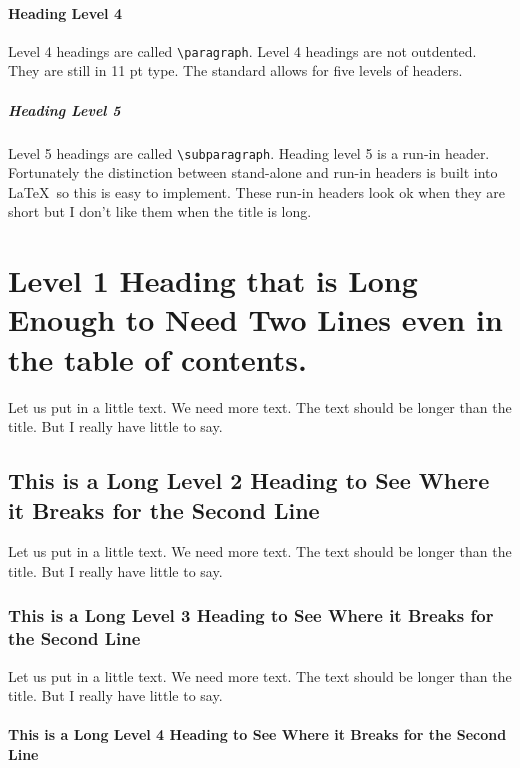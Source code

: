 \paragraph{Heading Level 4}

Level 4 headings are called \verb|\paragraph|.  Level 4 headings are
not outdented. They are still in 11 pt type. The standard allows for
five levels of headers.


\subparagraph{Heading Level 5}Level 5 headings are called
\verb|\subparagraph|.  Heading level 5 is a run-in header.  Fortunately
the distinction between stand-alone and run-in headers is built into
\LaTeX\ so this is easy to implement.  These run-in headers look ok when
they are short but I don't like them when the title is long.


\section{Level 1 Heading that is Long Enough 
to Need Two Lines even in the table of contents.}


Let us put in a little text.  We need more text.  The text should be
longer than the title.  But I really have little to say.


\subsection{This is a Long Level 2 Heading to See Where it 
Breaks for the Second Line}


Let us put in a little text.  We need more text.  The text should be
longer than the title.  But I really have little to say.



\subsubsection{This is a Long Level 3 Heading to See Where it 
Breaks for the Second Line}


Let us put in a little text.  We need more text.  The text should be
longer than the title.  But I really have little to say.



\paragraph{This is a Long Level 4 Heading to See Where it Breaks for
the Second Line}

